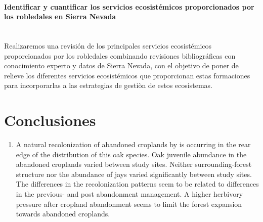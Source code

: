 \paragraph{Identificar y cuantificar los servicios ecosistémicos proporcionados por los robledales en Sierra Nevada}\mbox{} \\
Realizaremos una revisión de los principales servicios ecosistémicos proporcionados por los robledales combinando revisiones bibliográficas con conocimiento experto y datos de Sierra Nevada, con el objetivo de poner de relieve los diferentes servicios ecosistémicos que proporcionan estas formaciones para incorporarlas a las estrategias de gestiòn de estos ecosistemas. 



\section{Conclusiones}\label{sec:conclussions:en}

\begin{enumerate}
\renewcommand{\labelenumi}{\textbf{\textcolor{ctcolormain}{\arabic{enumi}.}}}

    \item A natural recolonization of abandoned croplands by \Qp is occurring in the rear edge of the distribution of this oak species. Oak juvenile abundance in the abandoned croplands varied between study sites. Neither surrounding-forest structure nor the abundance of jays varied significantly between study sites. The differences in the recolonization patterns seem to be related to differences in the previous- and post abandonment management. A higher herbivory pressure after cropland abandonment seems to limit the forest expansion towards abandoned croplands.
    
    
\end{enumerate}